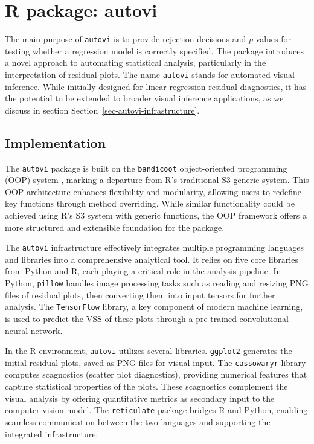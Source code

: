 \documentclass[
doublespace,
  times]{anzsauth}
\begin{document}
\section{R package: autovi}\label{sec-autovi}

The main purpose of \texttt{autovi} is to provide rejection decisions
and \(p\)-values for testing whether a regression model is correctly
specified. The package introduces a novel approach to automating
statistical analysis, particularly in the interpretation of residual
plots. The name \texttt{autovi} stands for automated visual inference.
While initially designed for linear regression residual diagnostics, it
has the potential to be extended to broader visual inference
applications, as we discuss in section
Section~\ref{sec-autovi-infrastructure}.

\subsection{Implementation}\label{sec-autovi-implementation}

The \texttt{autovi} package is built on the \texttt{bandicoot}
object-oriented programming (OOP) system \citep{bandicoot}, marking a
departure from R's traditional S3 generic system. This OOP architecture
enhances flexibility and modularity, allowing users to redefine key
functions through method overriding. While similar functionality could
be achieved using R's S3 system with generic functions, the OOP
framework offers a more structured and extensible foundation for the
package.

The \texttt{autovi} infrastructure effectively integrates multiple
programming languages and libraries into a comprehensive analytical
tool. It relies on five core libraries from Python and R, each playing a
critical role in the analysis pipeline. In Python, \texttt{pillow}
\citep{clark2015pillow} handles image processing tasks such as reading
and resizing PNG files of residual plots, then converting them into
input tensors for further analysis. The \texttt{TensorFlow}
\citep{abadi2016tensorflow} library, a key component of modern machine
learning, is used to predict the VSS of these plots through a
pre-trained convolutional neural network.

In the R environment, \texttt{autovi} utilizes several libraries.
\texttt{ggplot2} \citep{ggplot2} generates the initial residual plots,
saved as PNG files for visual input. The \texttt{cassowaryr}
\citep{mason2022cassowaryr} library computes scagnostics (scatter plot
diagnostics), providing numerical features that capture statistical
properties of the plots. These scagnostics complement the visual
analysis by offering quantitative metrics as secondary input to the
computer vision model. The \texttt{reticulate} \citep{reticulate}
package bridges R and Python, enabling seamless communication between
the two languages and supporting the integrated infrastructure.
\end{document}
